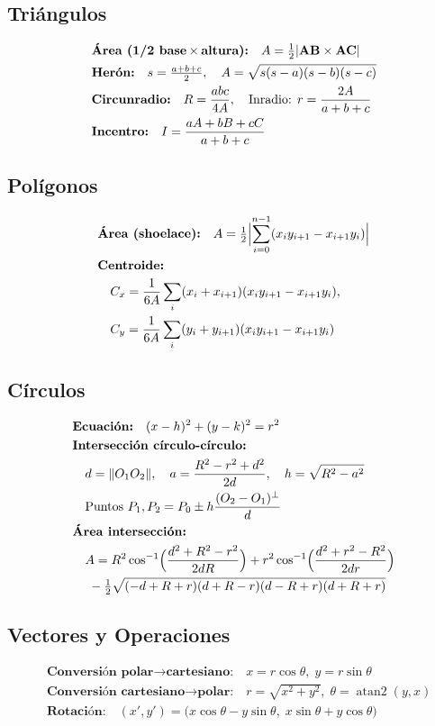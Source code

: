 \documentclass[10pt,landscape,twocolumn,a4paper,notitlepage]{article}
\begin{document}
\subsection{Triángulos}
\begin{align}
  &\textbf{Área (1/2 base\,$\times$\,altura):} \quad A=\tfrac12|\mathbf{AB}\times\mathbf{AC}| \\
  &\textbf{Herón:} \quad s=\tfrac{a+b+c}{2}, \quad A=\sqrt{s(s-a)(s-b)(s-c)} \\
  &\textbf{Circunradio:} \quad R=\frac{abc}{4A}, \quad \text{Inradio: } r=\frac{2A}{a+b+c} \\
  &\textbf{Incentro:} \quad I=\frac{aA + bB + cC}{a+b+c}
\end{align}

\subsection{Polígonos}
\begin{align}
  &\textbf{Área (shoelace):} \quad A=\tfrac12\Bigl|\sum_{i=0}^{n-1}(x_i y_{i+1} - x_{i+1} y_i)\Bigr| \\
  &\textbf{Centroide:} \\
  &\quad C_x=\frac{1}{6A}\sum_{i}(x_i+x_{i+1})(x_i y_{i+1}-x_{i+1}y_i), \\ 
  &\quad C_y=\frac{1}{6A}\sum_{i}(y_i+y_{i+1})(x_i y_{i+1}-x_{i+1}y_i)
\end{align}

\subsection{Círculos}
\begin{align}
  &\textbf{Ecuación:} \quad (x-h)^2+(y-k)^2=r^2 \\
  &\textbf{Intersección círculo-círculo:} \\
  &\quad d=\|O_1O_2\|, \quad a=\frac{R^2 - r^2 + d^2}{2d}, \quad h=\sqrt{R^2-a^2} \\
  &\quad \text{Puntos }P_1, P_2 = P_0 \pm h\frac{(O_2-O_1)^{\perp}}{d} \\
  &\textbf{Área intersección:} \\
  &\quad A=R^2\cos^{-1}\Bigl(\frac{d^2+R^2-r^2}{2dR}\Bigr)
        +r^2\cos^{-1}\Bigl(\frac{d^2+r^2-R^2}{2dr}\Bigr)\\
  &\quad\; -\tfrac12\sqrt{(-d+R+r)(d+R-r)(d-R+r)(d+R+r)}
\end{align}

\subsection{Vectores y Operaciones}
\begin{align}
  &\textbf{Conversión polar→cartesiano:} \quad x=r\cos\theta,\;y=r\sin\theta \\
  &\textbf{Conversión cartesiano→polar:} \quad r=\sqrt{x^2+y^2},\;\theta=\operatorname{atan2}(y,x) \\
  &\textbf{Rotación:} \quad (x',y')=\bigl(x\cos\theta - y\sin\theta,\; x\sin\theta + y\cos\theta\bigr)
\end{align}
\end{document}
